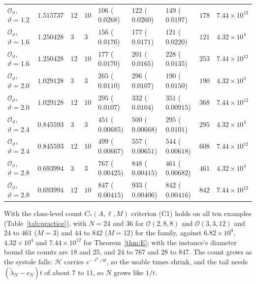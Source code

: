 \documentclass[pdflatex,sn-mathphys-num]{sn-jnl}
\theoremstyle{thmstyleone}%
\theoremstyle{thmstylethree}%
\newcommand{\Orb}{\mathcal{O}}
\begin{document}
\begin{table}[t]
\begin{tabular}{@{}lllllllll@{}}
$\Orb_\vartheta$, $\vartheta=1.2$ & $1.515737$ & $12$ & $10$ & $106$ ($0.0268$) & $122$ ($0.0260$) & $149$ ($0.0197$) & $178$ & $7.44\times10^{12}$\\
$\Orb_\vartheta$, $\vartheta=1.6$ & $1.250428$ & $3$ & $3$ & $156$ ($0.0176$) & $177$ ($0.0171$) & $121$ ($0.0220$) & $121$ & $4.32\times10^{4}$\\
$\Orb_\vartheta$, $\vartheta=1.6$ & $1.250428$ & $12$ & $10$ & $177$ ($0.0170$) & $201$ ($0.0165$) & $228$ ($0.0135$) & $253$ & $7.44\times10^{12}$\\
$\Orb_\vartheta$, $\vartheta=2.0$ & $1.029128$ & $3$ & $3$ & $265$ ($0.0110$) & $296$ ($0.0107$) & $190$ ($0.0150$) & $190$ & $4.32\times10^{4}$\\
$\Orb_\vartheta$, $\vartheta=2.0$ & $1.029128$ & $12$ & $10$ & $295$ ($0.0107$) & $332$ ($0.0104$) & $351$ ($0.00915$) & $368$ & $7.44\times10^{12}$\\
$\Orb_\vartheta$, $\vartheta=2.4$ & $0.845593$ & $3$ & $3$ & $451$ ($0.00685$) & $500$ ($0.00668$) & $295$ ($0.0101$) & $295$ & $4.32\times10^{4}$\\
$\Orb_\vartheta$, $\vartheta=2.4$ & $0.845593$ & $12$ & $10$ & $499$ ($0.00667$) & $557$ ($0.00651$) & $544$ ($0.00618$) & $608$ & $7.44\times10^{12}$\\
$\Orb_\vartheta$, $\vartheta=2.8$ & $0.693994$ & $3$ & $3$ & $767$ ($0.00425$) & $848$ ($0.00415$) & $461$ ($0.00682$) & $461$ & $4.32\times10^{4}$\\
$\Orb_\vartheta$, $\vartheta=2.8$ & $0.693994$ & $12$ & $10$ & $847$ ($0.00415$) & $933$ ($0.00406$) & $842$ ($0.00416$) & $842$ & $7.44\times10^{12}$\\
\bottomrule
\end{tabular}
\end{table}

With the class-level count $C_*(A,\ell,M)$ criterion (C1) holds on all ten examples (Table~\ref{tab:practice}), with $N=24$ and $36$ for $\Orb(2,8,8)$ and $\Orb(3,3,12)$ and $24$ to $461$ ($M=3$) and $44$ to $842$ ($M=12$) for the family, against $6.82\times10^9$, $4.32\times10^4$ and $7.44\times10^{12}$ for Theorem~\ref{thm:E}; with the instance's diameter bound the counts are $18$ and $25$, and $24$ to $767$ and $28$ to $847$. The count grows as the systole falls: $\mathcal H$ carries $e^{-\ell^2/4t}$, so the usable times shrink, and the tail needs $(\tilde\lambda_N-\epsilon_N)t$ of about $7$ to $11$, so $N$ grows like $1/t$.
\end{document}
